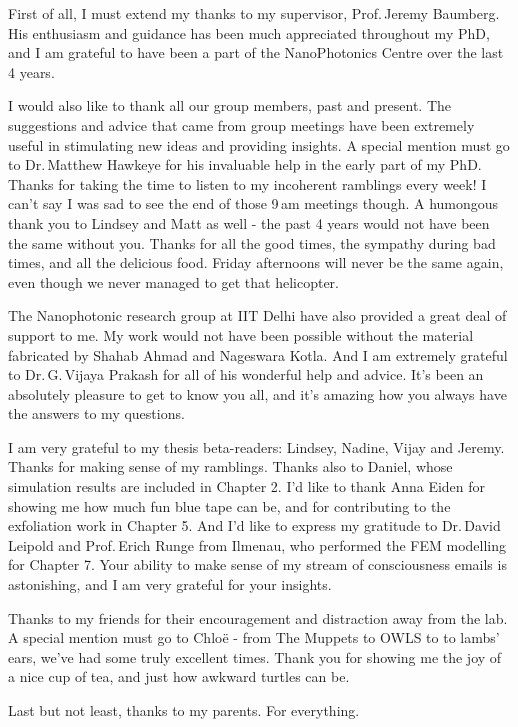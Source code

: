 
\begin{acknowledgements}      
\noindent First of all, I must extend my thanks to my supervisor, Prof.\,Jeremy Baumberg. His enthusiasm and guidance has been much appreciated throughout my PhD, and I am grateful to have been a part of the NanoPhotonics Centre over the last 4 years.

I would also like to thank all our group members, past and present. The suggestions and advice that came from group meetings have been extremely useful in stimulating new ideas and providing insights. A special mention must go to Dr.\,Matthew Hawkeye for his invaluable help in the early part of my PhD. Thanks for taking the time to listen to my incoherent ramblings every week! I can't say I was sad to see the end of those 9\,am meetings though. A humongous thank you to Lindsey and Matt as well - the past 4 years would not have been the same without you. Thanks for all the good times, the sympathy during bad times, and all the delicious food. Friday afternoons will never be the same again, even though we never managed to get that helicopter.

The Nanophotonic research group at IIT Delhi have also provided a great deal of support to me. My work would not have been possible without the material fabricated by Shahab Ahmad and Nageswara Kotla. And I am extremely grateful to Dr.\,G.\,Vijaya Prakash for all of his wonderful help and advice. It's been an absolutely pleasure to get to know you all, and it's amazing how you always have the answers to my questions.

I am very grateful to my thesis beta-readers: Lindsey, Nadine, Vijay and Jeremy. Thanks for making sense of my ramblings. Thanks also to Daniel, whose simulation results are included in Chapter 2. I'd like to thank Anna Eiden for showing me how much fun blue tape can be, and for contributing to the exfoliation work in Chapter 5. And I'd like to express my gratitude to Dr.\,David Leipold and Prof.\,Erich Runge from Ilmenau, who performed the FEM modelling for Chapter 7. Your ability to make sense of my stream of consciousness emails is astonishing, and I am very grateful for your insights.

Thanks to my friends for their encouragement and distraction away from the lab. A special mention must go to Chlo{\"e} - from The Muppets to OWLS to to lambs' ears, we've had some truly excellent times. Thank you for showing me the joy of a nice cup of tea, and just how awkward turtles can be. 

Last but not least, thanks to my parents. For everything.
\end{acknowledgements}
